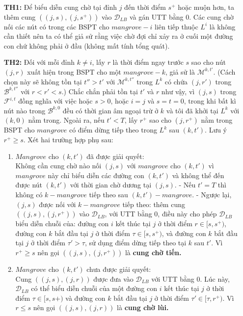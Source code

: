\documentclass[../main.tex]{subfiles}
\begin{document}
\begin{enumerate}
\def\labelenumi{\arabic{enumi}.}
\item[\textbf{TH1:}]
Để biểu diễn cung chờ tại đỉnh \(j\) đến thời
  điểm \(s^+\) hoặc muộn hơn, ta thêm cung \(((j, s), (j, s^+))\) vào
  \(\mathcal D_{LB}\) và gán UTT bằng \(0\). Các cung chờ nối các nút có
  trong các BSPT cho \(mangrove-i\) liên tiếp thuộc \(L^i\) là không cần
  thiết nên ta có thể giả sử rằng việc chờ đợi chỉ xảy ra ở cuối một
  đường con chứ không phải ở đầu (không mất tính tổng quát).
\item[\textbf{TH2:}]
   Đối với mỗi đỉnh \(k\neq i\), lấy \(r\) là thời
  điểm ngay trước \(s\) sao cho nút \((j,r)\) xuất hiện trong BSPT cho
  một \(mangrove-k\), giả sử là \(\mathcal M^{k,t'}\). (Cách chọn này sẽ
  không tồn tại \(t'' > t'\) với \(\mathcal M^{k,t''}\) trong \(L^k\) có
  chứa \((j,r')\) trong \(\mathcal B^{k,t''}\) với \(r < r' < s\).) Chắc
  chắn phải tồn tại \(t'\) và \(r\) như vậy, vì \((j, s)\) trong
  \(\mathcal F^{i,t}\) đồng nghĩa với việc hoặc \(s>0\), hoặc \(i = j\) và
  \(s = t = 0\), trong khi bất kì nút nào trong \(\mathcal B^{k,0}\) đều có
  thời gian âm ngoại trừ ở \(k\) và tôi đã khởi tại \(L^k\) với
  \((k,0)\) nằm trong. Ngoài ra, nếu \(t'<T\), lấy \(r^+\) sao cho
  \((j,r^+)\) nằm trong BSPT cho \(mangrove\) có điểm dừng tiếp theo
  trong \(L^k\) sau \((k, t')\). Lưu ý \(r^+ \geq s\). Xét hai trường
  hợp phụ sau:

  \begin{enumerate}
  \def\labelenumii{\alph{enumii}.}
  \tightlist
  \item
    \(Mangrove\) cho \((k, t')\) đã được giải quyết: \\
    Không cần cung chờ
    nào nối \((j,s)\) với \(mangrove\) cho \((k,t')\) vì \(mangrove\)
    này chỉ biểu diễn các đường con \((k,t')\) và không thể đến được nút
    \((k, t')\) với thời gian chờ dương tại \((j, s)\). - Nếu \(t'=T\)
    thì không có \(k-mangrove\) tiếp theo sau \((k,t')-mangrove\). -
    Ngược lại, \((j,s)\) được nối với \(k-mangrove\) tiếp theo: thêm
    cung \(((j,s),(j,r^+))\) vào \(\mathcal D_{LB}\), với UTT bằng
    \(0\), điều này cho phép \(\mathcal D_{LB}\) biểu diễn chuỗi của:
    đường con \(i\) kết thúc tại \(j\) ở thời điểm \(r\in [s,s^+)\),
    đường con \(k\) bắt đầu tại \(j\) ở thời điểm \(\tau \in [s, s^+)\),
    và đường con \(k\) bắt đầu tại \(j\) ở thời điểm \(\tau' > \tau\),
    sử dụng điểm dừng tiếp theo tại \(k\) sau \(t'\). Vì \(r^+ \geq s\)
    nên gọi \(((j,s),(j,r^+))\) là \textbf{cung chờ tiến.}
  \item
    \(Mangrove\) cho \((k, t')\) chưa được giải quyết: \\
    Cung
    \(((j,s),(j,r))\) được đưa vào \(\mathcal D_{LB}\) với UTT bằng 0.
    Lúc này, \(\mathcal D_{LB}\) có thể biểu diễn chuỗi của một đường
    con \(i\) kết thúc tại \(j\) ở thời điểm \(\tau \in [s,s+)\) và
    đường con \(k\) bắt đầu tại \(j\) ở thời điểm
    \(\tau' \in [\tau,r^+)\). Vì \(r\leq s\) nên gọi \(((j,s),(j,r))\)
    là \textbf{cung chờ lùi.}
  \end{enumerate}
\end{enumerate}
\end{document}
